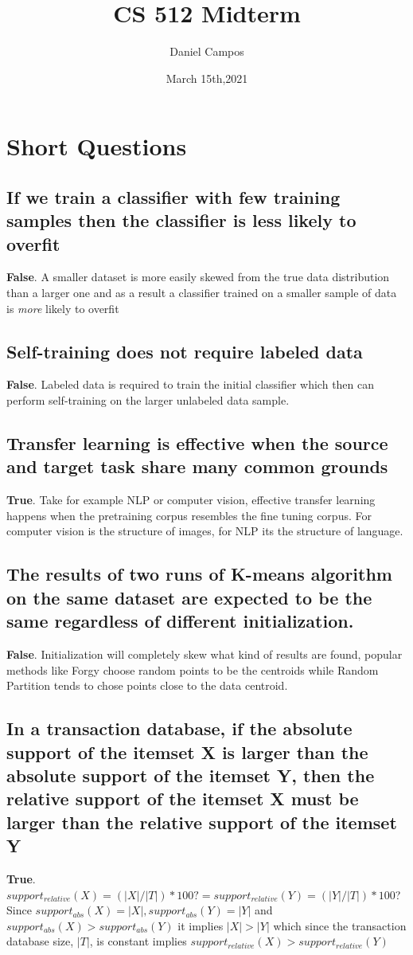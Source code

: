 \documentclass[11pt]{article}
\title{CS 512 Midterm}
\author{Daniel Campos}
\date{March 15th,2021}
\begin{document}
\maketitle
\section{Short Questions}
\subsection{If we train a classifier with few training samples then the classifier is less likely to overfit}
\textbf{False}. A smaller dataset is more easily skewed from the true data distribution than a larger one and as a result a classifier trained on a smaller sample of data is \textit{more} likely to overfit
\subsection{Self-training does not require labeled data}
\textbf{False}. Labeled data is required to train the initial classifier which then can perform self-training on the larger unlabeled data sample.
\subsection{Transfer learning is effective when the source and target task share many common grounds}
\textbf{True}. Take for example NLP or computer vision, effective transfer learning happens when the pretraining corpus resembles the fine tuning corpus. For computer vision is the structure of images, for NLP its the structure of language. 
\subsection{The results of two runs of K-means algorithm on the same dataset are expected to be the same regardless of different initialization.}
\textbf{False}. Initialization will completely skew what kind of results are found, popular methods like Forgy choose random points to be the centroids while Random Partition tends to chose points close to the data centroid. 
\subsection{In a transaction database, if the absolute support of the itemset X is larger than the absolute support of the itemset Y, then the relative support of the itemset X must be larger than the relative support of the itemset Y}
\textbf{True}. $support_{relative}(X) = (|X|/|T|)*100 ?= support_{relative}(Y) = (|Y|/|T|)*100$? Since $support_{abs}(X) = |X|,  support_{abs}(Y) = |Y|$ and $support_{abs}(X) > support_{abs}(Y)$ it implies $|X| > |Y|$ which since the transaction database size, $|T|$, is constant implies $support_{relative}(X) > support_{relative}(Y)$
\end{document}
